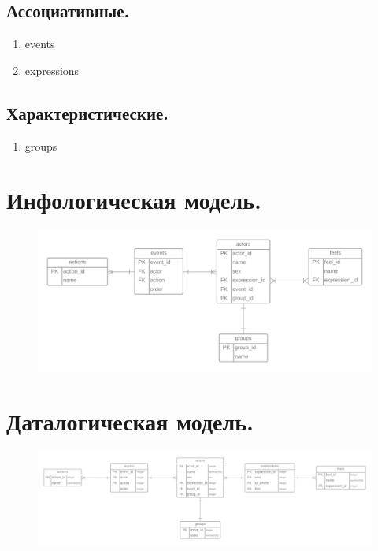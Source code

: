 \subsection{Ассоциативные.}

\begin{enumerate}
    \item events
    \item expressions
\end{enumerate}

\subsection{Характеристические.}

\begin{enumerate}
    \item groups
\end{enumerate}

\section{Инфологическая модель.}
\begin{figure}[H]
	\centering
	\includegraphics[scale=0.15]{img/info_model}
\end{figure}

\section{Даталогическая модель.}
\begin{figure}[H]
	\centering
	\includegraphics[scale=0.2]{img/data_model}
\end{figure}

